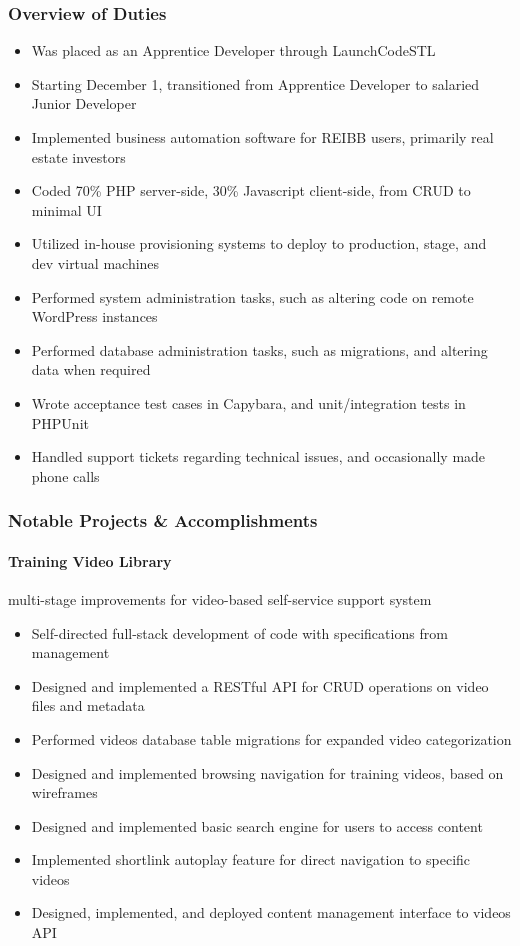 \documentclass[11pt]{article}
\begin{document}
\subsubsection*{Overview of Duties}
\begin{itemize}[noitemsep,leftmargin=1em]
	\item Was placed as an Apprentice Developer through LaunchCodeSTL
	\item Starting December 1, transitioned from Apprentice Developer to salaried Junior Developer
	\item Implemented business automation software for REIBB users, primarily real estate investors
	\item Coded 70\% PHP server-side, 30\% Javascript client-side, from CRUD to minimal UI
	\item Utilized in-house provisioning systems to deploy to production, stage, and dev virtual machines
	\item Performed system administration tasks, such as altering code on remote WordPress instances
	\item Performed database administration tasks, such as migrations, and altering data when required
	\item Wrote acceptance test cases in Capybara, and unit/integration tests in PHPUnit
	\item Handled support tickets regarding technical issues, and occasionally made phone calls
\end{itemize}

\subsubsection*{Notable Projects \& Accomplishments}

\paragraph{Training Video Library} multi-stage improvements for video-based self-service support system
\begin{itemize}[noitemsep,leftmargin=1em]
	\item Self-directed full-stack development of code with specifications from management
	\item Designed and implemented a RESTful API for CRUD operations on video files and metadata
	\item Performed videos database table migrations for expanded video categorization
	\item Designed and implemented browsing navigation for training videos, based on wireframes
	\item Designed and implemented basic search engine for users to access content
	\item Implemented shortlink autoplay feature for direct navigation to specific videos
	\item Designed, implemented, and deployed content management interface to videos API
\end{itemize}
\end{document}
